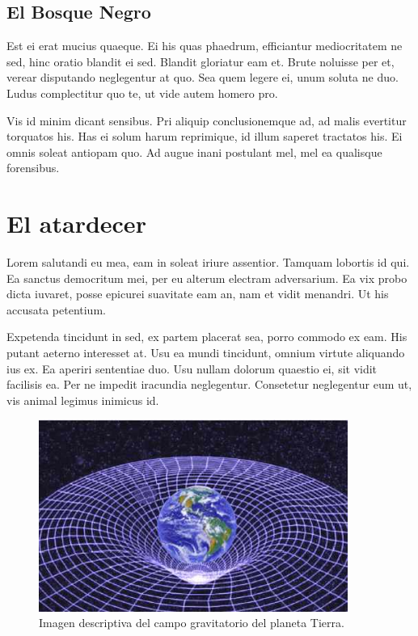 \documentclass[a4paper, 11pt, titlepage, twocolumn]{book}
\begin{document}
\section{El Bosque Negro}

Est ei erat mucius quaeque. Ei his quas phaedrum, efficiantur mediocritatem ne sed, hinc oratio blandit ei sed. Blandit gloriatur eam et. Brute noluisse per et, verear disputando neglegentur at quo. Sea quem legere ei, unum soluta ne duo. Ludus complectitur quo te, ut vide autem homero pro.

Vis id minim dicant sensibus. Pri aliquip conclusionemque ad, ad malis evertitur torquatos his. Has ei solum harum reprimique, id illum saperet tractatos his. Ei omnis soleat antiopam quo. Ad augue inani postulant mel, mel ea qualisque forensibus.

\chapter{El atardecer}

Lorem salutandi eu mea, eam in soleat iriure assentior. Tamquam lobortis id qui. Ea sanctus democritum mei, per eu alterum electram adversarium. Ea vix probo dicta iuvaret, posse epicurei suavitate eam an, nam et vidit menandri. Ut his accusata petentium.

Expetenda tincidunt in sed, ex partem placerat sea, porro commodo ex eam. His putant aeterno interesset at. Usu ea mundi tincidunt, omnium virtute aliquando ius ex. Ea aperiri sententiae duo. Usu nullam dolorum quaestio ei, sit vidit facilisis ea. Per ne impedit iracundia neglegentur. Consetetur neglegentur eum ut, vis animal legimus inimicus id.

\begin{figure}[htp]
    \centering
    \includegraphics[width=0.9\textwidth]{imagen.jpeg}
    \caption{Imagen descriptiva del campo gravitatorio del planeta Tierra.}
    \label{}
\end{figure}
\end{document}
